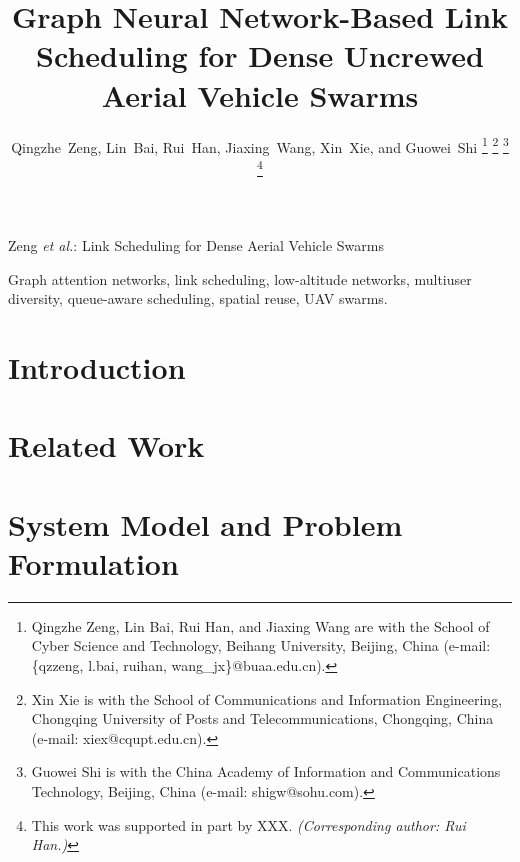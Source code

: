 \documentclass[letterpaper,journal]{IEEEtran}
\begin{document}
	
	\title{Graph Neural Network-Based Link Scheduling for Dense Uncrewed Aerial Vehicle Swarms}
	
	\author{Qingzhe~Zeng, Lin~Bai, Rui~Han, Jiaxing~Wang, Xin~Xie, and Guowei~Shi%
		\thanks{Qingzhe Zeng, Lin Bai, Rui Han, and Jiaxing Wang are with the School of Cyber Science and Technology, Beihang University, Beijing, China (e-mail: \{qzzeng, l.bai, ruihan, wang\_jx\}@buaa.edu.cn).}%
		\thanks{Xin Xie is with the School of Communications and Information Engineering, Chongqing University of Posts and Telecommunications, Chongqing, China (e-mail: xiex@cqupt.edu.cn).}%
		\thanks{Guowei Shi is with the China Academy of Information and Communications Technology, Beijing, China (e-mail: shigw@sohu.com).}%
		\thanks{This work was supported in part by XXX. \emph{(Corresponding author: Rui Han.)}}}
	
	{Zeng \MakeLowercase{\textit{et al.}}: Link Scheduling for Dense Aerial Vehicle Swarms}
	
	\maketitle
	
	\begin{abstract}
		
	\end{abstract}
	
	\begin{IEEEkeywords}
		Graph attention networks, link scheduling, low-altitude networks, multiuser diversity, queue-aware scheduling, spatial reuse, UAV swarms.
	\end{IEEEkeywords}
	
	\section{Introduction}
	\label{sec:introduction}
	
	\section{Related Work}
	\label{sec:related_work}
	


	
	\section{System Model and Problem Formulation}
	\label{sec:system_model}
	
\end{document}
